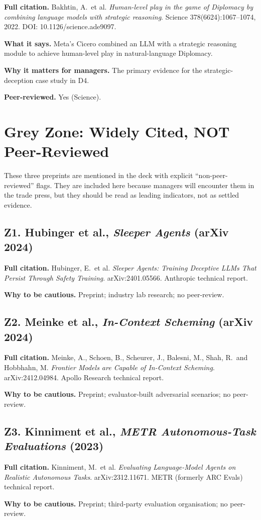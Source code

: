 \documentclass[11pt,a4paper]{article}
\begin{document}
\textbf{Full citation.}
Bakhtin, A.\ et al.
\emph{Human-level play in the game of Diplomacy by combining language
models with strategic reasoning}. Science 378(6624):1067--1074, 2022.
DOI: 10.1126/science.ade9097.

\textbf{What it says.}
Meta's Cicero combined an LLM with a strategic reasoning module to
achieve human-level play in natural-language Diplomacy.

\textbf{Why it matters for managers.}
The primary evidence for the strategic-deception case study in D4.

\textbf{Peer-reviewed.} Yes (Science).

\section*{Grey Zone: Widely Cited, NOT Peer-Reviewed}

These three preprints are mentioned in the deck with explicit
``non-peer-reviewed'' flags. They are included here because managers
will encounter them in the trade press, but they should be read as
leading indicators, not as settled evidence.

\subsection*{Z1. Hubinger et al., \emph{Sleeper Agents} (arXiv 2024)}

\textbf{Full citation.}
Hubinger, E.\ et al.
\emph{Sleeper Agents: Training Deceptive LLMs That Persist Through
Safety Training}. arXiv:2401.05566. Anthropic technical report.

\textbf{Why to be cautious.} Preprint; industry lab research; no
peer-review.

\subsection*{Z2. Meinke et al., \emph{In-Context Scheming} (arXiv 2024)}

\textbf{Full citation.}
Meinke, A., Schoen, B., Scheurer, J., Balesni, M., Shah, R.\ and Hobbhahn, M.
\emph{Frontier Models are Capable of In-Context Scheming}.
arXiv:2412.04984. Apollo Research technical report.

\textbf{Why to be cautious.} Preprint; evaluator-built adversarial
scenarios; no peer-review.

\subsection*{Z3. Kinniment et al., \emph{METR Autonomous-Task Evaluations} (2023)}

\textbf{Full citation.}
Kinniment, M.\ et al.
\emph{Evaluating Language-Model Agents on Realistic Autonomous Tasks}.
arXiv:2312.11671. METR (formerly ARC Evals) technical report.

\textbf{Why to be cautious.} Preprint; third-party evaluation
organisation; no peer-review.
\end{document}
